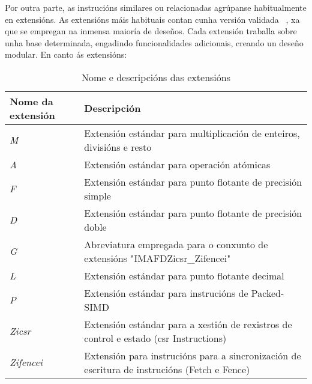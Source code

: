 Por outra parte, as instrucións similares ou relacionadas agrúpanse habitualmente en extensións. As extensións máis habituais contan cunha versión validada ~\cite{ratified_extensions}, xa que se empregan na inmensa maioría de deseños. Cada extensión traballa sobre unha base determinada, engadindo funcionalidades adicionais, creando un deseño modular. 
En canto ás extensións: 

\begin{table}[hp!]
  \centering
  \begin{tabular}{|p{5cm}|p{7cm}|}
    \rowcolor{udcpink!25}
    \textbf{Nome da extensión} & \textbf{Descripción} \\\hline
    \textit{M} & Extensión estándar para multiplicación de enteiros, divisións e resto \\
    \textit{A} & Extensión estándar para operación atómicas \\
    \textit{F} & Extensión estándar para punto flotante de precisión simple \\
    \textit{D} & Extensión estándar para punto flotante de precisión doble \\
    \textit{G} & Abreviatura empregada para o conxunto de extensións "IMAFDZicsr\_Zifencei" \\
    \textit{L} & Extensión estándar para punto flotante decimal \\
    \textit{P} & Extensión estándar para instrucións de Packed-SIMD \\
    \textit{Zicsr} & Extensión estándar para a xestión de rexistros de control e estado (\acrfull{csr} Instructions) \\
    \textit{Zifencei} &  Extensión para instrucións para a sincronización de escritura de instrucións (Fetch e Fence) \\
  \end{tabular}
  \caption{Nome e descripcións das extensións}
  \label{tab:extensiones}
\end{table}


